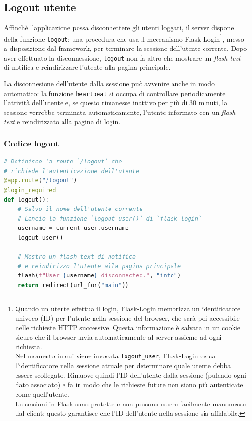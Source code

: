 \documentclass[12pt]{report}
\newcommand{\http}{\textsf{HTTP}\xspace}
\begin{document}
\subsection{Logout utente}
Affinchè l'applicazione possa disconnettere gli utenti loggati, il server dispone della funzione \texttt{logout}: una procedura che usa il meccanismo \textsf{Flask-Login}\footnote{Quando un utente effettua il login, \textsf{Flask-Login} memorizza un identificatore univoco (\textsf{ID}) per l'utente nella sessione del browser, che sarà poi accessibile nelle richieste \http successive. Questa informazione è salvata in un cookie sicuro che il browser invia automaticamente al server assieme ad ogni richiesta.\\
Nel momento in cui viene invocata \texttt{logout\_user}, \textsf{Flask-Login} cerca l'identificatore nella sessione attuale per determinare quale utente debba essere scollegato. Rimuove quindi l'\textsf{ID} dell'utente dalla sessione (pulendo ogni dato associato) e fa in modo che le richieste future non siano più autenticate come quell'utente.\\
Le sessioni in Flask sono protette e non possono essere facilmente manomesse dal client: questo garantisce che l'\textsf{ID} dell'utente nella sessione sia affidabile.}, messo a disposizione dal framework, per terminare la sessione dell'utente corrente. Dopo aver effettuato la disconnessione, \texttt{logout} non fa altro che mostrare un \textit{flash-text} di notifica e reindirizzare l'utente alla pagina principale.

La disconnesione dell'utente dalla sessione può avvenire anche in modo automatico: la funzione \texttt{heartbeat} si occupa di controllare periodicamente l'attività dell'utente e, se questo rimanesse inattivo per più di 30 minuti, la sessione verrebbe terminata automaticamente, l'utente informato con un \textit{flash-text} e reindirizzato alla pagina di login.


\subsubsection{Codice logout}
\begin{lstlisting}[language=Python]
# Definisco la route `/logout` che
# richiede l'autenticazione dell'utente
@app.route("/logout")
@login_required
def logout():
    # Salvo il nome dell'utente corrente
    # Lancio la funzione `logout_user()` di `flask-login`
    username = current_user.username
    logout_user()

    # Mostro un flash-text di notifica
    # e reindirizzo l'utente alla pagina principale
    flash(f"User {username} disconnected.", "info")
    return redirect(url_for("main"))
\end{lstlisting}
\end{document}
